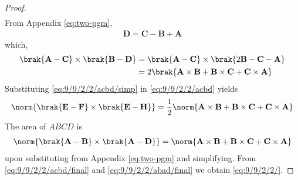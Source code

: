 \documentclass[a4paper,12pt]{report}
\let\vec\mathbf
\begin{document}
\begin{multicols}{2}
\begin{proof}
\begin{align}
		\label{eq:9/9/2/2/acbd}
	\end{align}
	From Appendix
	  \ref{eq:two-pgm}, 
  \begin{align}
 \vec{D} =\vec{C} - \vec{B}+\vec{A}  
	\end{align}
	which, 	\begin{align}
		\brak{\vec{A}-\vec{C}}  
		\times
		\brak{\vec{B}-\vec{D}}  
		&= 
		\brak{\vec{A}-\vec{C}}  
		\times
		\brak{2\vec{B}-\vec{C}-\vec{A}}  
		\\
		&=2 \brak{\vec{A}
		\times\vec{B}
		+\vec{B}
		\times\vec{C}
		+\vec{C}
		\times\vec{A}
		}
		\label{eq:9/9/2/2/acbd/simp}
	\end{align}
Substituting 
		\eqref{eq:9/9/2/2/acbd/simp}
in 
		\eqref{eq:9/9/2/2/acbd} yields
	\begin{align}
		\norm{	\brak{\vec{E}-\vec{F}}\times 
		\brak{	\vec{E}-\vec{H}  }} = \frac{1}{2}
\norm{\vec{A}
		\times\vec{B}
		+\vec{B}
		\times\vec{C}
		+\vec{C}
		\times\vec{A}
		}
		\label{eq:9/9/2/2/acbd/final}
	\end{align}
		The area of $ABCD$ is 
	\begin{align}
		\norm{	\brak{\vec{A}-\vec{B}}\times 
		\brak{	\vec{A}-\vec{D}  }} =
\norm{\vec{A}
		\times\vec{B}
		+\vec{B}
		\times\vec{C}
		+\vec{C}
		\times\vec{A}
		}
		\label{eq:9/9/2/2/abad/final}
	\end{align}
	upon substituting from Appendix
	  \ref{eq:two-pgm} 
	  and simplifying.  From 
		\eqref{eq:9/9/2/2/acbd/final}
		and 
		\eqref{eq:9/9/2/2/abad/final}
		we obtain 
		\eqref{eq:9/9/2/2/}.
	  \end{proof}



\end{multicols}
\end{document}

